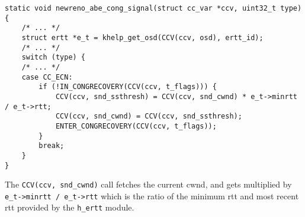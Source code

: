 \begin{verbatim}
static void newreno_abe_cong_signal(struct cc_var *ccv, uint32_t type) {
    /* ... */
    struct ertt *e_t = khelp_get_osd(CCV(ccv, osd), ertt_id);
    /* ... */
    switch (type) {
    /* ... */
    case CC_ECN:
        if (!IN_CONGRECOVERY(CCV(ccv, t_flags))) {
            CCV(ccv, snd_ssthresh) = CCV(ccv, snd_cwnd) * e_t->minrtt / e_t->rtt;
            CCV(ccv, snd_cwnd) = CCV(ccv, snd_ssthresh);
            ENTER_CONGRECOVERY(CCV(ccv, t_flags));
        }
        break;
    }
}
\end{verbatim}
The \lstinline{CCV(ccv, snd_cwnd)} call fetches the current \gls{cwnd}, and gets multiplied by \lstinline{e_t->minrtt / e_t->rtt} which is the ratio of the minimum \gls{rtt} and most recent \gls{rtt} provided by the \lstinline{h_ertt} module.